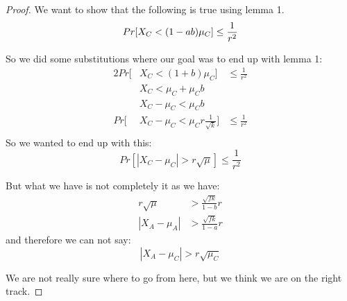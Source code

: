 \begin{proof}
    We want to show that the following is true using lemma 1.
    \begin{equation*}
        Pr[X_C < (1-ab)\mu_C] \le \frac{1}{r^2}\\
    \end{equation*}

    So we did some substitutions where our goal was to end up with lemma 1:
    \begin{alignat*}{2}
        Pr[&X_C < (1+b)\mu_C]& \le \frac{1}{r^2}\\
        &X_C < \mu_C + \mu_C b&\\
        &X_C - \mu_C < \mu_C b&\\
        Pr[&X_C - \mu_C < \mu_C r \frac{1}{\sqrt{k}}]& \le \frac{1}{r^2}\\ 
    \end{alignat*}
    So we wanted to end up with this:
    \begin{equation*}
        Pr[|X_C - \mu_C| > r \sqrt{\mu}] \le \frac{1}{r^2}
    \end{equation*}

    But what we have is not completely it as we have:
    \begin{align*}
        r \sqrt{\mu} &> \frac{\sqrt{fk}}{1-b} r\\
        |X_A - \mu_A| &> \frac{\sqrt{fk}}{1-a} r
    \end{align*}
    and therefore we can not say:
    \begin{equation*}
        |X_A - \mu_C| > r \sqrt{\mu_C}
    \end{equation*}

    We are not really sure where to go from here, but we think we are on the
    right track.


\end{proof}
